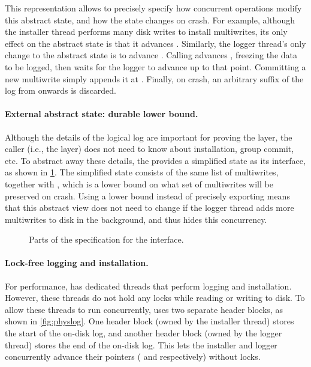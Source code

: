 This representation allows \txn to precisely specify how concurrent
operations modify this abstract state, and how the state changes on crash.
For example, although the installer thread performs many disk writes to
install multiwrites, its only effect on the abstract state is that it
advances .  Similarly, the logger thread's only change to
the abstract state is to advance .  Calling 
advances , freezing the data to be logged, then waits
for the logger to advance  up to that point.  Committing a
new multiwrite simply appends it at .  Finally, on crash,
an arbitrary suffix of the log from  onwards is discarded.


\paragraph{External abstract state: durable lower bound.}
Although the details of the logical log are important for proving the
 layer, the caller (i.e., the  layer) does not need
to know about installation, group commit, etc. To abstract away these
details, the  provides a simplified state as its interface,
as shown in \cref{fig:wal-spec}.  The simplified state consists of
the same list of multiwrites, together with , which is
a lower bound on what set of multiwrites will be preserved on crash.
Using a lower bound instead of precisely exporting  means
that this abstract view does not need to change if the logger thread
adds more multiwrites to disk in the background, and thus hides
this concurrency.

\begin{figure}[ht]

\vspace{-\baselineskip}
\caption{Parts of the specification for the  interface.}
\label{fig:wal-spec}
\end{figure}


\paragraph{Lock-free logging and installation.}
For performance, \txn has dedicated threads that perform logging and
installation.  However, these threads do not hold any locks while reading
or writing to disk.  To allow these threads to run concurrently, \txn
uses two separate header blocks, as shown in \cref{fig:physlog}.
One header block (owned by the installer thread) stores the start of
the on-disk log, and another header block (owned by the logger thread)
stores the end of the on-disk log.  This lets the installer and logger
concurrently advance their pointers ( and 
respectively) without locks.

